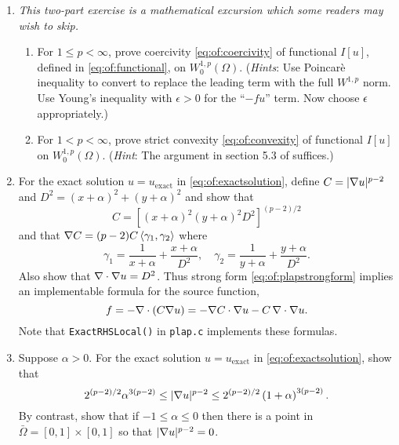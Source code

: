 \renewcommand{\labelenumi}{\arabic{chapter}.\arabic{enumi}\quad}
\renewcommand{\labelenumii}{(\alph{enumii})}
\begin{enumerate}
\item  \label{exer:of:twoproperties}  \emph{This two-part exercise is a mathematical excursion which some readers may wish to skip.}
  \begin{enumerate}
  \item For $1 \le p < \infty$, prove coercivity \eqref{eq:of:coercivity} of functional $I[u]$, defined in \eqref{eq:of:functional}, on $W_0^{1,p}(\Omega)$.  (\emph{Hints}:  Use Poincar\`e inequality \citep[Theorem 6.30]{AdamsFournier2003} to convert to replace the leading term with the full $W^{1,p}$ norm.  Use Young's inequality with $\epsilon>0$ \citep[Appendix B]{Evans2010} for the ``$-fu$'' term.  Now choose $\epsilon$ appropriately.)
  \item For $1 < p < \infty$, prove strict convexity \eqref{eq:of:convexity} of functional $I[u]$ on $W_0^{1,p}(\Omega)$.  (\emph{Hint}:  The argument in section 5.3 of \citet{Ciarlet2002} suffices.)
  \end{enumerate}
 
\item \label{exer:of:checkexactformulas}  For the exact solution $u=u_{\text{exact}}$ in \eqref{eq:of:exactsolution}, define $C = |\nabla u|^{p-2}$ and $D^2=(x+\alpha)^2 + (y+\alpha)^2$ and show that
    $$C = \left[(x+\alpha)^2 (y+\alpha)^2 D^2\right]^{(p-2)/2}$$
and that $\nabla C = (p-2) C \left<\gamma_1,\gamma_2\right>$ where
    $$\gamma_1 = \frac{1}{x+\alpha}+ \frac{x+\alpha}{D^2}, \quad \gamma_2 = \frac{1}{y+\alpha}+ \frac{y+\alpha}{D^2}.$$
Also show that $\nabla\cdot \nabla u = D^2$.  Thus strong form \eqref{eq:of:plapstrongform} implies an implementable formula for the source function,
    $$f = - \nabla\cdot \left(C \nabla u\right) = - \nabla C \cdot \nabla u - C\, \nabla\cdot \nabla u.$$
Note that \texttt{ExactRHSLocal()} in \texttt{plap.c} implements these formulas.

\item \label{exer:of:checkexactbounds} Suppose $\alpha > 0$.  For the exact solution $u=u_{\text{exact}}$ in \eqref{eq:of:exactsolution}, show that
\begin{equation}
2^{(p-2)/2} \alpha^{3(p-2)} \le |\nabla u|^{p-2} \le 2^{(p-2)/2} \left(1+\alpha\right)^{3(p-2)}.  \label{eq:of:coeffbounds}
\end{equation}
By contrast, show that if $-1 \le \alpha \le 0$ then there is a point in $\bar\Omega=[0,1]\times[0,1]$ so that $|\nabla u|^{p-2}=0$.


\end{enumerate}
